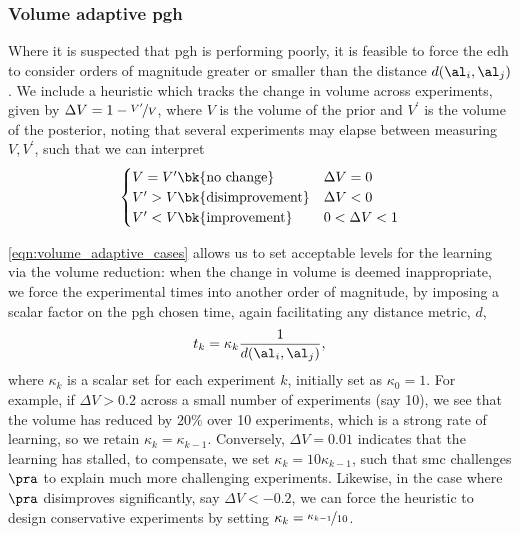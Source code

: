 \subsubsection{Volume adaptive \gls{pgh}}
Where it is suspected that \gls{pgh} is performing poorly, it is feasible to force the \gls{edh} to consider orders of magnitude 
    greater or smaller than the distance $d(\al_i, \al_j)$.
We include a heuristic which tracks the change in volume across experiments, 
    given by $\Delta V = 1 - \nicefrac{V^{\prime}}{V}$, where $V$ is the volume of the prior
    and $V^{\prime}$ is the volume of the posterior, 
    noting that several experiments may elapse between measuring $V, V^{\prime}$,
    such that we can interpret
\begin{align}
    \label{eqn:volume_adaptive_cases}
    \begin{cases}
        V = V^{\prime} \bk{ \textrm{no change} }  & \Delta V = 0   \\
        V^{\prime} > V  \bk{ \textrm{disimprovement} }  & \Delta V < 0  \\ 
        V^{\prime} < V \bk{ \textrm{improvement} }   & 0 < \Delta V < 1\\ 
    \end{cases}
\end{align}

\cref{eqn:volume_adaptive_cases} allows us to set acceptable levels for the learning via the volume reduction: 
    when the change in volume is deemed inappropriate, we force the experimental times into another order of magnitude, 
    by imposing a scalar factor on the \gls{pgh} chosen time, again facilitating any distance metric, $d$, 
\begin{equation}
    \label{eqn:volume_adaptive_pgh}
    t_k = \kappa_k \frac{1}{d(\al_i, \al_j)},
\end{equation}
    where $\kappa_k$ is a scalar set for each experiment $k$, initially set as $\kappa_0=1$.
For example, if $\Delta V > 0.2$ across a small number of experiments (say 10), 
    we see that the volume has reduced by $20\%$ over 10 experiments, which is a strong rate of learning, 
    so we retain $\kappa_k = \kappa_{k-1}$. 
Conversely, $\Delta V = 0.01$ indicates that the learning has stalled, 
    to compensate, we set $\kappa_{k} = 10 \kappa_{k-1}$, 
    such that \gls{smc} challenges $\pra$ to explain much more challenging experiments.
Likewise, in the case where $\pra$ disimproves significantly, say $\Delta V < -0.2$, 
    we can force the heuristic to design conservative experiments by setting $\kappa_k = \nicefrac{\kappa_{k-1}}{10}$. 

